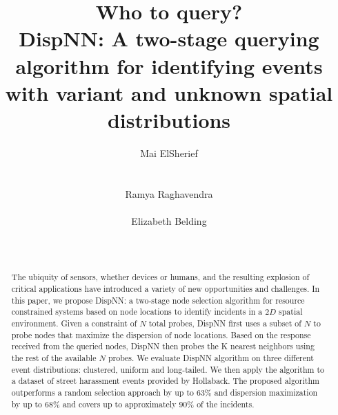 \documentclass{acm_proc_article-sp}
\begin{document}
\title{Who to query? \\DispNN: A two-stage querying algorithm for identifying events with variant and unknown spatial distributions }
\author{
%
%
\alignauthor
Mai ElSherief\\
\\
\\
\alignauthor
Ramya Raghavendra\\
\\
\alignauthor
Elizabeth Belding\\
\\
\\
}
\maketitle
\begin{abstract}
The ubiquity of sensors, whether devices or humans, and the resulting explosion of critical applications have introduced a variety of new opportunities and challenges. In this paper, we propose DispNN: a two-stage node selection algorithm for resource constrained systems based on node locations to identify incidents in a $2D$ spatial environment. Given a constraint of $N$ total probes, DispNN first uses a subset of $N$ to probe nodes that maximize the dispersion of node locations. Based on the response received from the queried nodes, DispNN then probes the K nearest neighbors using the rest of the available $N$ probes. We evaluate DispNN algorithm on three different event distributions: clustered, uniform and long-tailed. We then apply the algorithm to a dataset of street harassment events provided by Hollaback. The proposed algorithm outperforms a random selection approach by up to $63\%$ and dispersion maximization by up to $68\%$ and covers up to approximately $90\%$ of the incidents.
\end{abstract}
\end{document}
